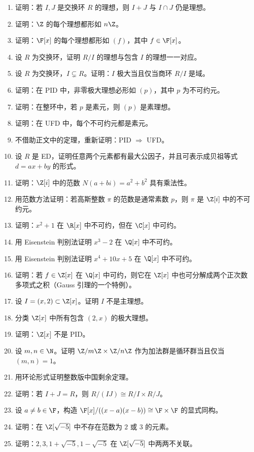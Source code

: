 \begin{enumerate}[label=\textbf{9.\arabic*}, leftmargin=*, resume]
  \item \medium 证明：若 $I,J$ 是交换环 $R$ 的理想，则 $I+J$ 与 $I\cap J$ 仍是理想。
  \item \medium 证明：$\Z$ 的每个理想都形如 $n\Z$。
  \item \medium 证明：$\F[x]$ 的每个理想都形如 $(f)$，其中 $f\in\F[x]$。
  \item \medium 设 $R$ 为交换环，证明 $R/I$ 的理想与包含 $I$ 的理想一一对应。
  \item \medium 设 $R$ 为交换环，$I\subsetneq R$。证明：$I$ 极大当且仅当商环 $R/I$ 是域。
  \item \medium 证明：在 PID 中，非零极大理想必形如 $(p)$，其中 $p$ 为不可约元。
  \item \medium 证明：在整环中，若 $p$ 是素元，则 $(p)$ 是素理想。
  \item \medium 证明：在 UFD 中，每个不可约元都是素元。
  \item \medium 不借助正文中的定理，重新证明：PID $\Rightarrow$ UFD。
  \item \medium 设 $R$ 是 ED，证明任意两个元素都有最大公因子，并且可表示成贝祖等式 $d=ax+by$ 的形式。
  \item \medium 证明：$\Z[i]$ 中的范数 $N(a+bi)=a^2+b^2$ 具有乘法性。
  \item \medium 用范数方法证明：若高斯整数 $\pi$ 的范数是通常素数 $p$，则 $\pi$ 是 $\Z[i]$ 中的不可约元。
  \item \medium 证明：$x^2+1$ 在 $\R[x]$ 中不可约，但在 $\C[x]$ 中可约。
  \item \medium 用 Eisenstein 判别法证明 $x^3-2$ 在 $\Q[x]$ 中不可约。
  \item \medium 用 Eisenstein 判别法证明 $x^4+10x+5$ 在 $\Q[x]$ 中不可约。
  \item \medium 证明：若 $f\in\Z[x]$ 在 $\Q[x]$ 中可约，则它在 $\Z[x]$ 中也可分解成两个正次数多项式之积（Gauss 引理的一个特例）。
  \item \medium 设 $I=(x,2)\subset \Z[x]$。证明 $I$ 不是主理想。
  \item \medium 分类 $\Z[x]$ 中所有包含 $(2,x)$ 的极大理想。
  \item \medium 证明：$\Z[x]$ 不是 PID。
  \item \medium 设 $m,n\in\N$。证明 $\Z/m\Z\times \Z/n\Z$ 作为加法群是循环群当且仅当 $(m,n)=1$。
  \item \medium 用环论形式证明整数版中国剩余定理。
  \item \medium 证明：若 $I+J=R$，则 $R/(IJ)\cong R/I\times R/J$。
  \item \medium 设 $a\neq b\in \F$，构造 $\F[x]/((x-a)(x-b))\cong \F\times \F$ 的显式同构。
  \item \medium 证明：在 $\Z[\sqrt{-5}]$ 中不存在范数为 $2$ 或 $3$ 的元素。
  \item \medium 证明：$2,3,1+\sqrt{-5},1-\sqrt{-5}$ 在 $\Z[\sqrt{-5}]$ 中两两不关联。
\end{enumerate}

